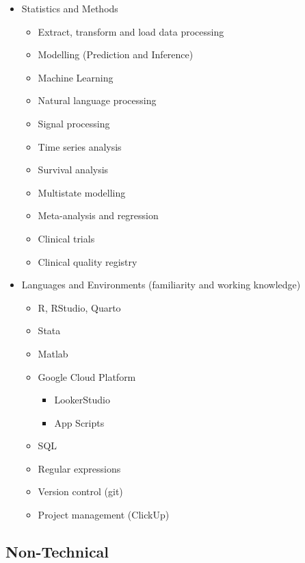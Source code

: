 \documentclass[
  letterpaper,
  DIV=11,
  numbers=noendperiod]{scrartcl}
\providecommand{\tightlist}{%
  \setlength{\itemsep}{0pt}\setlength{\parskip}{0pt}}\usepackage{longtable,booktabs,array}
\begin{document}
\begin{itemize}
\tightlist
\item
  Statistics and Methods

  \begin{itemize}
  \tightlist
  \item
    Extract, transform and load data processing
  \item
    Modelling (Prediction and Inference)
  \item
    Machine Learning
  \item
    Natural language processing
  \item
    Signal processing
  \item
    Time series analysis
  \item
    Survival analysis
  \item
    Multistate modelling
  \item
    Meta-analysis and regression
  \item
    Clinical trials
  \item
    Clinical quality registry
  \end{itemize}
\item
  Languages and Environments (familiarity and working knowledge)

  \begin{itemize}
  \tightlist
  \item
    R, RStudio, Quarto
  \item
    Stata
  \item
    Matlab
  \item
    Google Cloud Platform

    \begin{itemize}
    \tightlist
    \item
      LookerStudio
    \item
      App Scripts
    \end{itemize}
  \item
    SQL
  \item
    Regular expressions
  \item
    Version control (git)
  \item
    Project management (ClickUp)
  \end{itemize}
\end{itemize}

\subsection{Non-Technical}\label{non-technical}
\end{document}
